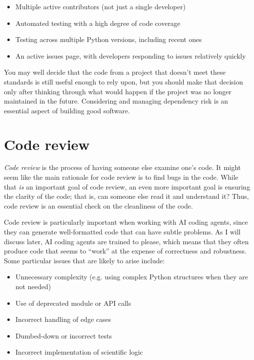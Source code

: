 \begin{itemize}
\item Multiple active contributors (not just a single developer)
\item Automated testing with a high degree of code coverage
\item Testing across multiple Python versions, including recent ones
\item An active issues page, with developers responding to issues relatively quickly
\end{itemize}

You may well decide that the code from a project that doesn't meet these standards is still useful enough to rely upon, but you should make that decision only after thinking through what would happen if the project was no longer maintained in the future.  Considering and managing dependency risk is an essential aspect of building good software.

\section{Code review}

\textit{Code review} is the process of having someone else examine one's code.  It might seem like the main rationale for code review is to find bugs in the code. While that \textit{is} an important goal of code review, an even more important goal is ensuring the clarity of the code; that is, can someone else read it and understand it?  Thus, code review is an essential check on the cleanliness of the code.

Code review is particularly important when working with AI coding agents, since they can generate well-formatted code that can have subtle problems.  As I will discuss later, AI coding agents are trained to please, which means that they often produce code that seems to ``work'' at the expense of correctness and robustness. Some particular issues that are likely to arise include:

\begin{itemize}
\item Unnecessary complexity (e.g. using complex Python structures when they are not needed)
\item Use of deprecated module or API calls
\item Incorrect handling of edge cases
\item Dumbed-down or incorrect tests
\item Incorrect implementation of scientific logic
\end{itemize}

